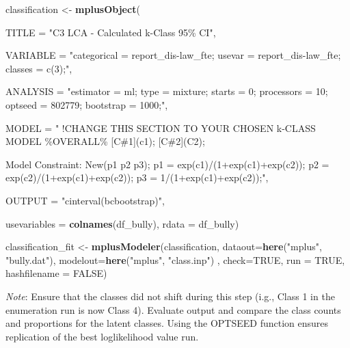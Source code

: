 \documentclass[
]{book}
\newenvironment{Shaded}{\begin{snugshade}}{\end{snugshade}}
\newcommand{\AttributeTok}[1]{\textcolor[rgb]{0.13,0.29,0.53}{#1}}
\newcommand{\ConstantTok}[1]{\textcolor[rgb]{0.56,0.35,0.01}{#1}}
\newcommand{\FunctionTok}[1]{\textcolor[rgb]{0.13,0.29,0.53}{\textbf{#1}}}
\newcommand{\NormalTok}[1]{#1}
\newcommand{\OtherTok}[1]{\textcolor[rgb]{0.56,0.35,0.01}{#1}}
\newcommand{\StringTok}[1]{\textcolor[rgb]{0.31,0.60,0.02}{#1}}
\begin{document}
\begin{Shaded}
\begin{Highlighting}[]
\NormalTok{classification  }\OtherTok{\textless{}{-}} \FunctionTok{mplusObject}\NormalTok{(}
  
  \AttributeTok{TITLE =} \StringTok{"C3 LCA {-} Calculated k{-}Class 95\% CI"}\NormalTok{,}
  
  \AttributeTok{VARIABLE =}
    \StringTok{"categorical = report\_dis{-}law\_fte;}
\StringTok{   usevar =  report\_dis{-}law\_fte;}
\StringTok{   classes = c(3);"}\NormalTok{, }
  
  \AttributeTok{ANALYSIS =}
    \StringTok{"estimator = ml;}
\StringTok{    type = mixture;}
\StringTok{    starts = 0; }
\StringTok{    processors = 10;}
\StringTok{    optseed = 802779;}
\StringTok{    bootstrap = 1000;"}\NormalTok{,}
  
  \AttributeTok{MODEL =}
    \StringTok{"}
\StringTok{  !CHANGE THIS SECTION TO YOUR CHOSEN k{-}CLASS MODEL}
\StringTok{    }
\StringTok{  \%OVERALL\%}
\StringTok{  [C\#1](c1);}
\StringTok{  }
\StringTok{  [C\#2](C2);}

\StringTok{  Model Constraint:}
\StringTok{  New(p1 p2 p3);}
\StringTok{  }
\StringTok{  p1 = exp(c1)/(1+exp(c1)+exp(c2));}
\StringTok{  p2 = exp(c2)/(1+exp(c1)+exp(c2));}
\StringTok{  p3 = 1/(1+exp(c1)+exp(c2));"}\NormalTok{,}

  
  \AttributeTok{OUTPUT =} \StringTok{"cinterval(bcbootstrap)"}\NormalTok{,}
  
  \AttributeTok{usevariables =} \FunctionTok{colnames}\NormalTok{(df\_bully),}
  \AttributeTok{rdata =}\NormalTok{ df\_bully)}

\NormalTok{classification\_fit }\OtherTok{\textless{}{-}} \FunctionTok{mplusModeler}\NormalTok{(classification,}
                \AttributeTok{dataout=}\FunctionTok{here}\NormalTok{(}\StringTok{"mplus"}\NormalTok{, }\StringTok{"bully.dat"}\NormalTok{),}
                \AttributeTok{modelout=}\FunctionTok{here}\NormalTok{(}\StringTok{"mplus"}\NormalTok{, }\StringTok{"class.inp"}\NormalTok{) ,}
                \AttributeTok{check=}\ConstantTok{TRUE}\NormalTok{, }\AttributeTok{run =} \ConstantTok{TRUE}\NormalTok{, }\AttributeTok{hashfilename =} \ConstantTok{FALSE}\NormalTok{)}
\end{Highlighting}
\end{Shaded}

\emph{Note}: Ensure that the classes did not shift during this step (i.g., Class 1 in the enumeration run is now Class 4). Evaluate output and compare the class counts and proportions for the latent classes. Using the OPTSEED function ensures replication of the best loglikelihood value run.
\end{document}
